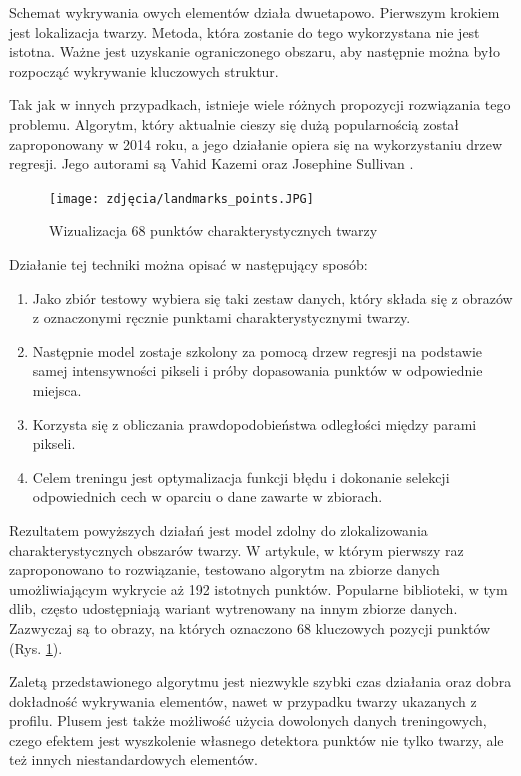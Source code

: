Schemat wykrywania owych elementów działa dwuetapowo. Pierwszym krokiem jest lokalizacja twarzy. Metoda, która zostanie do tego wykorzystana nie jest istotna. Ważne jest uzyskanie ograniczonego obszaru, aby następnie można było rozpocząć wykrywanie kluczowych struktur. 

Tak jak w innych przypadkach, istnieje wiele różnych propozycji rozwiązania tego problemu. Algorytm, który aktualnie cieszy się dużą popularnością został zaproponowany w 2014 roku, a jego działanie opiera się na wykorzystaniu drzew regresji. Jego autorami są Vahid Kazemi oraz Josephine Sullivan \cite{landmarks}. 

\begin{figure}[h]
	\centering
	\texttt{[image: zdjęcia/landmarks\_points.JPG]}
	\caption{Wizualizacja 68 punktów charakterystycznych twarzy \cite{landmarksPoints}}
	\label{fig:landmarks}
\end{figure}

Działanie tej techniki można opisać w następujący sposób:
\begin{enumerate}
    \item Jako zbiór testowy wybiera się taki zestaw danych, który składa się z obrazów z oznaczonymi ręcznie punktami charakterystycznymi twarzy.
    \item Następnie model zostaje szkolony za pomocą drzew regresji na podstawie samej intensywności pikseli i próby dopasowania punktów w odpowiednie miejsca.
    \item  Korzysta się z obliczania prawdopodobieństwa odległości między parami pikseli.
    \item Celem treningu jest optymalizacja funkcji błędu i dokonanie selekcji odpowiednich cech w oparciu o dane zawarte w zbiorach.
\end{enumerate}

Rezultatem powyższych działań jest model zdolny do zlokalizowania charakterystycznych obszarów twarzy. W artykule, w którym pierwszy raz zaproponowano to rozwiązanie, testowano algorytm na zbiorze danych umożliwiającym wykrycie aż 192 istotnych punktów. Popularne biblioteki, w tym dlib, często udostępniają wariant wytrenowany na innym zbiorze danych. Zazwyczaj są to obrazy, na których oznaczono 68 kluczowych pozycji punktów (Rys. \ref{fig:landmarks}).

Zaletą przedstawionego algorytmu jest niezwykle szybki czas działania oraz dobra dokładność wykrywania elementów, nawet w przypadku twarzy ukazanych z profilu. Plusem jest także możliwość użycia dowolonych danych treningowych, czego efektem jest wyszkolenie własnego detektora punktów nie tylko twarzy, ale też innych niestandardowych elementów.

